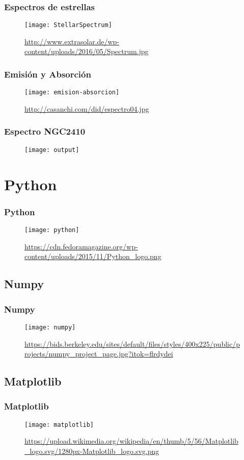 \documentclass{beamer}
\begin{document}
	\begin{frame}
	\frametitle{Espectros de estrellas}
	\begin{figure}
	\texttt{[image: StellarSpectrum]}
	\caption{\tiny{\url{http://www.extrasolar.de/wp-content/uploads/2016/05/Spectrum.jpg}}}
	\end{figure}

	\end{frame}
	\begin{frame}
	\frametitle{Emisión y Absorción}
	\begin{figure}
	\texttt{[image: emision-absorcion]}
	\caption{\tiny{\url{http://casanchi.com/did/espectro04.jpg}}}
	\end{figure}
	\end{frame}
	\begin{frame}
	\frametitle{Espectro NGC2410}
	\begin{figure}
	\texttt{[image: output]}
	\end{figure}
	\end{frame}
	\section{Python}
	\begin{frame}
	\frametitle{Python}
	\begin{figure}
	\texttt{[image: python]}
	\caption{\tiny{\url{https://cdn.fedoramagazine.org/wp-content/uploads/2015/11/Python_logo.png}}}
	\end{figure}
	\end{frame}
	\subsection{Numpy}
	\begin{frame}
	\frametitle{Numpy}
	\begin{figure}
	\texttt{[image: numpy]}
	\caption{\tiny{\url{https://bids.berkeley.edu/sites/default/files/styles/400x225/public/projects/numpy_project_page.jpg?itok=flrdydei}}}
	\end{figure}
	
	\end{frame}			
	\subsection{Matplotlib}
	\begin{frame}
	\frametitle{Matplotlib}
	\begin{figure}
	\texttt{[image: matplotlib]}
	\caption{\tiny{\url{https://upload.wikimedia.org/wikipedia/en/thumb/5/56/Matplotlib_logo.svg/1280px-Matplotlib_logo.svg.png}}}
	\end{figure}
	\end{frame}
\end{document}
